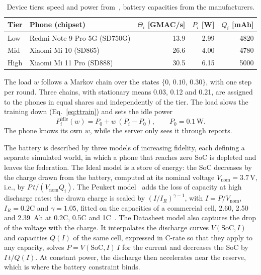 \begin{table}[t]
\centering
\caption{Device tiers: speed and power from~\cite{xu2022mandheling}, battery
capacities from the manufacturers.}
\label{tab:tiers}
\footnotesize
\setlength{\tabcolsep}{4pt}
\begin{tabular}{llrrr}
\hline
Tier & Phone (chipset) & $\Theta_i$ [GMAC/s] & $P_i$ [W] & $Q_i$ [mAh] \\
\hline
Low  & Redmi Note 9 Pro 5G (SD750G) & 13.9 & 2.99 & 4820 \\
Mid  & Xiaomi Mi 10 (SD865)         & 26.6 & 4.00 & 4780 \\
High & Xiaomi Mi 11 Pro (SD888)     & 30.5 & 6.15 & 5000 \\
\hline
\end{tabular}
\end{table}

The load $w$ follows a Markov chain over the states $\{0,\,0.10,\,0.30\}$, with
one step per round. Three chains, with stationary means 0.03, 0.12 and 0.21,
are assigned to the phones in equal shares and independently of the tier. The
load slows the training down (Eq.~\eqref{eq:ttrain}) and sets the idle power
\begin{equation}
  P^{\mathrm{idle}}_i(w) = P_0 + w\,(P_i - P_0), \qquad P_0=0.1\,\mathrm{W}.
  \label{eq:idle}
\end{equation}
The phone knows its own $w$, while the server only sees it through reports.

The battery is described by three models of increasing fidelity, each defining
a separate simulated world, in which a phone that reaches zero SoC is depleted
and leaves the federation. The Ideal model is a store of energy: the SoC
decreases by the charge drawn from the battery, computed at its nominal voltage
$V_{\mathrm{nom}}=3.7\,\mathrm{V}$, i.e., by $P\,t/(V_{\mathrm{nom}}Q_i)$. The
Peukert model~\cite{doerffel2006peukert} adds the loss of capacity at high
discharge rates: the drawn charge is scaled by $(I/I_R)^{\gamma-1}$, with
$I=P/V_{\mathrm{nom}}$, $I_R=0.2$C and $\gamma=1.05$, fitted on the capacities
of a commercial cell, 2.60, 2.50 and 2.39~Ah at 0.2C, 0.5C and
1C~\cite{datasheet}. The Datasheet model also captures the drop of the
voltage with the charge. It interpolates the discharge curves
$V(\mathrm{SoC},I)$ and capacities $Q(I)$ of the same cell, expressed in C-rate
so that they apply to any capacity, solves $P=V(\mathrm{SoC},I)\,I$ for the
current and decreases the SoC by $I\,t/Q(I)$. At constant power, the discharge
then accelerates near the reserve, which is where the battery constraint binds.

